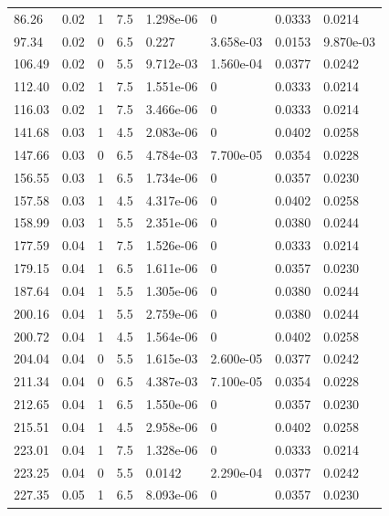 \documentclass[preview]{standalone}
\begin{document}
{{\begin{tabular}{L{1.2cm}C{1.2cm} C{0.3cm}C{0.5cm} C{1.4cm}C{1.4cm} C{1.4cm}C{1.4cm}}
  86.26  &  0.02  & 1     & 7.5 &  1.298e-06  & 0  & 0.0333 &  0.0214   \\ 
  97.34  &  0.02  & 0     & 6.5 &  0.227  & 3.658e-03  & 0.0153 &  9.870e-03   \\ 
  106.49  &  0.02  & 0     & 5.5 &  9.712e-03  & 1.560e-04  & 0.0377 &  0.0242   \\ 
  112.40  &  0.02  & 1     & 7.5 &  1.551e-06  & 0  & 0.0333 &  0.0214   \\ 
  116.03  &  0.02  & 1     & 7.5 &  3.466e-06  & 0  & 0.0333 &  0.0214   \\ 
  141.68  &  0.03  & 1     & 4.5 &  2.083e-06  & 0  & 0.0402 &  0.0258   \\ 
  147.66  &  0.03  & 0     & 6.5 &  4.784e-03  & 7.700e-05  & 0.0354 &  0.0228   \\ 
  156.55  &  0.03  & 1     & 6.5 &  1.734e-06  & 0  & 0.0357 &  0.0230   \\ 
  157.58  &  0.03  & 1     & 4.5 &  4.317e-06  & 0  & 0.0402 &  0.0258   \\ 
  158.99  &  0.03  & 1     & 5.5 &  2.351e-06  & 0  & 0.0380 &  0.0244   \\ 
  177.59  &  0.04  & 1     & 7.5 &  1.526e-06  & 0  & 0.0333 &  0.0214   \\ 
  179.15  &  0.04  & 1     & 6.5 &  1.611e-06  & 0  & 0.0357 &  0.0230   \\ 
  187.64  &  0.04  & 1     & 5.5 &  1.305e-06  & 0  & 0.0380 &  0.0244   \\ 
  200.16  &  0.04  & 1     & 5.5 &  2.759e-06  & 0  & 0.0380 &  0.0244   \\ 
  200.72  &  0.04  & 1     & 4.5 &  1.564e-06  & 0  & 0.0402 &  0.0258   \\ 
  204.04  &  0.04  & 0     & 5.5 &  1.615e-03  & 2.600e-05  & 0.0377 &  0.0242   \\ 
  211.34  &  0.04  & 0     & 6.5 &  4.387e-03  & 7.100e-05  & 0.0354 &  0.0228   \\ 
  212.65  &  0.04  & 1     & 6.5 &  1.550e-06  & 0  & 0.0357 &  0.0230   \\ 
  215.51  &  0.04  & 1     & 4.5 &  2.958e-06  & 0  & 0.0402 &  0.0258   \\ 
  223.01  &  0.04  & 1     & 7.5 &  1.328e-06  & 0  & 0.0333 &  0.0214   \\ 
  223.25  &  0.04  & 0     & 5.5 &  0.0142  & 2.290e-04  & 0.0377 &  0.0242   \\ 
  227.35  &  0.05  & 1     & 6.5 &  8.093e-06  & 0  & 0.0357 &  0.0230   \\ 

\end{tabular}}}
\end{document}
